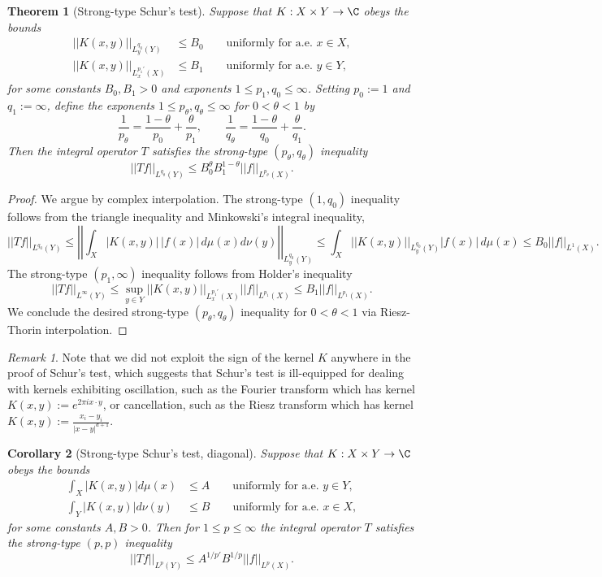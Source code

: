 \documentclass[reqno]{amsart}
\newtheorem{theorem}{Theorem}
\newtheorem{corollary}[theorem]{Corollary}
\theoremstyle{definition}
\theoremstyle{remark}
\newtheorem*{remark}{Remark}
\begin{document}
\begin{theorem}[Strong-type Schur's test]
	Suppose that $K: X \times Y \to \C$ obeys the bounds
		\begin{align*}
			 ||K (x, y) ||_{L^{q_0}_y (Y)} &\leq B_0 \qquad \text{uniformly for a.e. $x \in X$},\\
			 ||K(x, y)||_{L^{p_1'}_x (X)} &\leq B_1 \qquad \text{uniformly for a.e. $y \in Y$},
		\end{align*}	 
	for some constants $B_0, B_1 > 0$ and exponents $1 \leq p_1, q_0 \leq \infty$. Setting $p_0 := 1$ and $q_1 := \infty$, define the exponents $1 \leq p_\theta, q_\theta \leq \infty$ for $0 < \theta < 1$ by 
		\[ \frac{1}{p_\theta} = \frac{1 - \theta}{p_0} + \frac{\theta}{p_1}, \qquad \frac{1}{q_\theta} = \frac{1 - \theta}{q_0} + \frac{\theta}{q_1}. \]
	Then the integral operator $T$ satisfies the strong-type $(p_\theta, q_\theta)$ inequality
		\[ ||Tf||_{L^{q_\theta} (Y)} \leq B_0^\theta B_1^{1 - \theta} ||f||_{L^{p_\theta} (X)}. \]
\end{theorem}

\begin{proof}
	We argue by complex interpolation. The strong-type $(1, q_0)$ inequality follows from the triangle inequality and Minkowski's integral inequality, 
		\[ ||T f||_{L^{q_0} (Y)} \leq \left|\left| \int_X |K(x, y)| \, |f(x)| \, d\mu(x)  d \nu(y) \right|\right|_{L^{q_0}_y (Y)} \leq \int_X ||K (x, y) ||_{L^{q_0}_y (Y)} |f(x)| \, d \mu(x) \leq B_0 ||f||_{L^1 (X)} . \]
	The strong-type $(p_1, \infty)$ inequality follows from Holder's inequality
		\[ ||Tf||_{L^{\infty} (Y)} \leq \sup_{y \in Y} ||K(x, y)||_{L^{p_1'}_x (X)} ||f||_{L^{p_1} (X)} \leq B_1 ||f||_{L^{p_1} (X)}.\]	
	We conclude the desired strong-type $(p_\theta, q_\theta)$ inequality for $0 < \theta < 1$ via Riesz-Thorin interpolation. 
\end{proof}

\begin{remark}
	Note that we did not exploit the sign of the kernel $K$ anywhere in the proof of Schur's test, which suggests that Schur's test is ill-equipped for dealing with kernels exhibiting oscillation, such as the Fourier transform which has kernel $K(x, y) := e^{2\pi i x \cdot y}$, or cancellation, such as the Riesz transform which has kernel $K(x, y) := \tfrac{x_i - y_i}{|x - y|^{d + 1}}$. 
\end{remark}

\begin{corollary}[Strong-type Schur's test, diagonal]
	Suppose that $K: X \times Y \to \C$ obeys the bounds
		\begin{align*}
			 \int_X |K(x, y)| d \mu(x) &\leq A \qquad \text{uniformly for a.e. $y \in Y$},\\
			  \int_Y |K(x, y)| d \nu(y) &\leq B \qquad \text{uniformly for a.e. $x \in X$},
		\end{align*}	 
	for some constants $A, B > 0$. Then for $1 \leq p \leq \infty$ the integral operator $T$ satisfies the strong-type $(p, p)$ inequality 
		\[ ||Tf||_{L^p (Y)} \leq A^{1/p'} B^{1/p} ||f||_{L^p (X)}. \]
\end{corollary}
\end{document}
